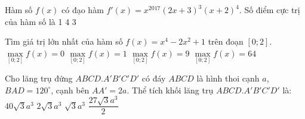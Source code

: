 \begin{ex}%
Hàm số $f(x)$ có đạo hàm $f'(x) = x^{2017}\left(2x + 3\right)^{3}{{(x + 2)}^{4}}$. Số điểm cực trị của hàm số là
\choice
{1}
{4}
{}
{3}
\end{ex}
\begin{ex}%
Tìm giá trị lớn nhất của hàm số $f(x) = x^4 - 2x^2 + 1$ trên đoạn $ [0; 2]$. 
\choice
{$\underset{[0; 2]}{\mathop{\max}} f(x) = 0$}
{$\underset{[0; 2]}{\mathop{\max}} f(x) = 1$}
{\True $\underset{[0; 2]}{\mathop{\max}} f(x) = 9$}
{$\underset{[0; 2]}{\mathop{\max}} f(x) = 64$}
\end{ex}
\begin{ex}%
Cho lăng trụ đứng $ABCD.A'B'C'D'$ có đáy $ABCD$ là hình thoi cạnh $a$, $BAD = {120}^{\circ}$, cạnh bên $AA' = 2a$. Thể tích khối lăng trụ $ABCD.A'B'C'D'$ là:
\choice
{$40\sqrt{3}a^3$}
{$2\sqrt{3}a^3$ }
{\True $\sqrt{3}a^3$}
{$\dfrac{27\sqrt{3}a^3}{2}$}
\end{ex}
